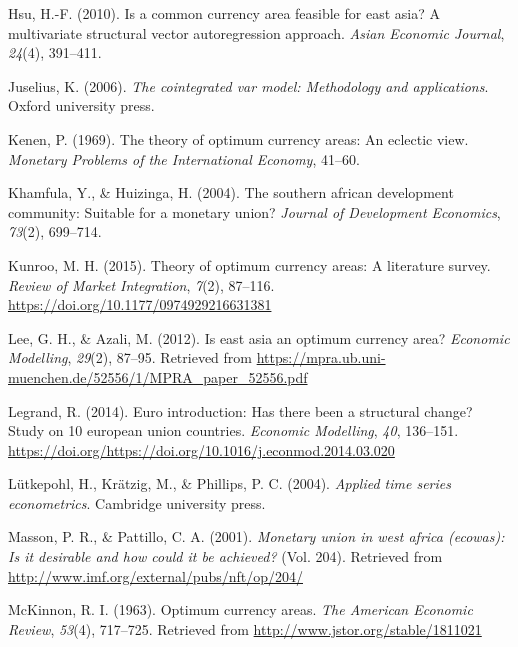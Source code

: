 \documentclass[]{article}
\begin{document}
\leavevmode\hypertarget{ref-hsu2010common}{}%
Hsu, H.-F. (2010). Is a common currency area feasible for east asia? A multivariate structural vector autoregression approach. \emph{Asian Economic Journal}, \emph{24}(4), 391--411.

\leavevmode\hypertarget{ref-juselius2006cointegrated}{}%
Juselius, K. (2006). \emph{The cointegrated var model: Methodology and applications}. Oxford university press.

\leavevmode\hypertarget{ref-kenen1969theory}{}%
Kenen, P. (1969). The theory of optimum currency areas: An eclectic view. \emph{Monetary Problems of the International Economy}, 41--60.

\leavevmode\hypertarget{ref-khamfula2004southern}{}%
Khamfula, Y., \& Huizinga, H. (2004). The southern african development community: Suitable for a monetary union? \emph{Journal of Development Economics}, \emph{73}(2), 699--714.

\leavevmode\hypertarget{ref-Kunroo2015}{}%
Kunroo, M. H. (2015). Theory of optimum currency areas: A literature survey. \emph{Review of Market Integration}, \emph{7}(2), 87--116. \url{https://doi.org/10.1177/0974929216631381}

\leavevmode\hypertarget{ref-lee2012east}{}%
Lee, G. H., \& Azali, M. (2012). Is east asia an optimum currency area? \emph{Economic Modelling}, \emph{29}(2), 87--95. Retrieved from \url{https://mpra.ub.uni-muenchen.de/52556/1/MPRA_paper_52556.pdf}

\leavevmode\hypertarget{ref-LEGRAND2014136}{}%
Legrand, R. (2014). Euro introduction: Has there been a structural change? Study on 10 european union countries. \emph{Economic Modelling}, \emph{40}, 136--151. \url{https://doi.org/https://doi.org/10.1016/j.econmod.2014.03.020}

\leavevmode\hypertarget{ref-lutkepohl2004applied}{}%
Lütkepohl, H., Krätzig, M., \& Phillips, P. C. (2004). \emph{Applied time series econometrics}. Cambridge university press.

\leavevmode\hypertarget{ref-masson2001monetary}{}%
Masson, P. R., \& Pattillo, C. A. (2001). \emph{Monetary union in west africa (ecowas): Is it desirable and how could it be achieved?} (Vol. 204). Retrieved from \url{http://www.imf.org/external/pubs/nft/op/204/}

\leavevmode\hypertarget{ref-McKinnon1963}{}%
McKinnon, R. I. (1963). Optimum currency areas. \emph{The American Economic Review}, \emph{53}(4), 717--725. Retrieved from \url{http://www.jstor.org/stable/1811021}
\end{document}
